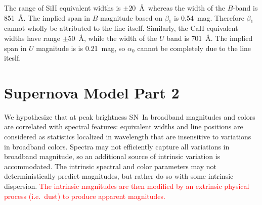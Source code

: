 \documentclass{aastex61}   	%
\begin{document}
The range of SiII equivalent widths is $\pm 20$~\AA\ whereas the width of the $B$-band is 851~\AA.  
The implied span in $B$ magnitude based on $\beta_1$ is 0.54~mag.  Therefore $\beta_1$ cannot wholly be attributed to the line itself.
Similarly, the CaII equivalent widths have range $\pm 50$~\AA, while the width of the $U$ band is
701~\AA.  The implied span in $U$ magnitude is is 0.21~mag, so $\alpha_0$ cannot be completely due to the line iteslf.


\section{Supernova Model Part 2}
\label{model2:sec}
We hypothesize that at peak brightness
SN~Ia broadband magnitudes and colors are correlated with
spectral features: equivalent widths and line positions are considered as statistics localized in wavelength that are insensitive to variations in
broadband colors.
Spectra may not efficiently capture all variations in broadband magnitude, so an additional source
of intrinsic variation is accommodated.
The intrinsic spectral and color parameters may not deterministically predict magnitudes, but rather do so with some intrinsic dispersion.
\textcolor{red}{The intrinsic magnitudes are then
modified by an extrinsic physical process (i.e.\ dust) to produce apparent magnitudes.}
\end{document}
